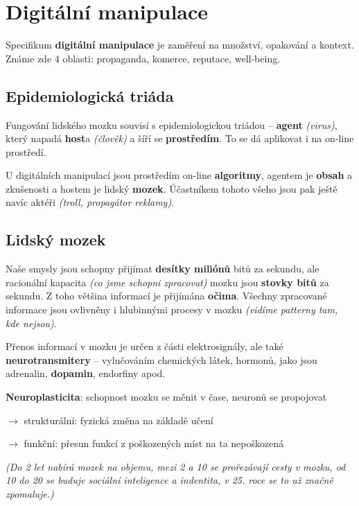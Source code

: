 \section{Digitální manipulace}

Specifikum \textbf{digitální manipulace} je zaměření na množství, opakování a kontext. Známe zde 4 oblasti: propaganda, komerce, reputace, well-being.

\subsection{Epidemiologická triáda}

Fungování lidského mozku souvisí s epidemiologickou triádou -- \textbf{agent} \textit{(virus)}, který napadá \textbf{host}a \textit{(člověk)} a šíří se \textbf{prostředím}. To se dá aplikovat i na on-line prostředí.

\vspace{4pt}
\noindent U digitálních manipulací jsou prostředím on-line \textbf{algoritmy}, agentem je \textbf{obsah} a zkušenosti a hostem je lidský \textbf{mozek}. Účastníkem tohoto všeho jsou pak ještě navíc aktéři \textit{(troll, propagátor reklamy)}.

\subsection{Lidský mozek}

Naše smysly jsou schopny přijímat \textbf{desítky miliónů} bitů za sekundu, ale racionální kapacita \textit{(co jsme schopni zpracovat)} mozku jsou \textbf{stovky bitů} za sekundu. Z toho většina informací je přijímána \textbf{očima}. Všechny zpracované informace jsou ovlivněny i hlubinnými procesy v mozku \textit{(vidíme patterny tam, kde nejsou)}.

\vspace{4pt}
\noindent Přenos informací v mozku je určen z části elektrosignály, ale také \textbf{neurotransmitery} -- vylučováním chemických látek, hormonů, jako jsou adrenalin, \textbf{dopamin}, endorfiny apod.

\vspace{4pt}
\noindent \textbf{Neuroplasticita}: schopnost mozku se měnit v čase, neuronů se propojovat

$\to$ strukturální: fyzická změna na základě učení

$\to$ funkční: přesun funkcí z poškozených míst na ta nepoškozená

\vspace{4pt}
\noindent \textit{(Do 2 let nabírá mozek na objemu, mezi 2 a 10 se prořezávají cesty v mozku, od 10 do 20 se buduje sociální inteligence a indentita, v 25. roce se to už značně zpomaluje.)}

